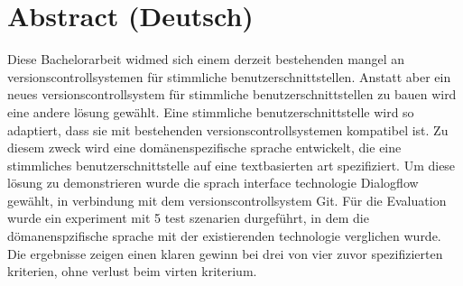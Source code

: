 \chapter*{Abstract (Deutsch)}

Diese Bachelorarbeit widmed sich einem derzeit bestehenden mangel an versionscontrollsystemen  für stimmliche benutzerschnittstellen.
Anstatt aber ein neues versionscontrollsystem für stimmliche benutzerschnittstellen zu bauen wird eine andere lösung gewählt. 
Eine stimmliche benutzerschnittstelle wird so adaptiert, dass sie mit bestehenden versionscontrollsystemen kompatibel ist.
Zu diesem  zweck wird eine domänenspezifische sprache entwickelt, die eine stimmliches benutzerschnittstelle auf eine textbasierten art spezifiziert. 
Um diese lösung zu demonstrieren wurde die sprach interface technologie Dialogflow gewählt, in verbindung mit dem versionscontrollsystem Git.
Für die Evaluation wurde ein experiment mit 5 test szenarien durgeführt, in dem die dömanenspzifische sprache mit der existierenden technologie verglichen wurde. Die ergebnisse zeigen einen klaren gewinn bei drei von vier zuvor spezifizierten kriterien, ohne verlust beim virten kriterium.
